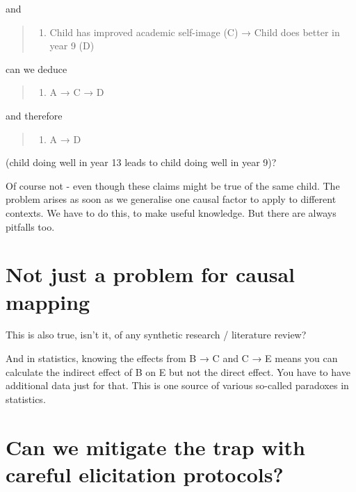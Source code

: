 \documentclass[
]{book}
\providecommand{\tightlist}{%
  \setlength{\itemsep}{0pt}\setlength{\parskip}{0pt}}
\begin{document}
and

\begin{quote}
\begin{enumerate}
\def\labelenumi{\arabic{enumi})}
\setcounter{enumi}{1}
\tightlist
\item
  Child has improved academic self-image (C) → Child does better in year 9 (D)
\end{enumerate}
\end{quote}

can we deduce

\begin{quote}
\begin{enumerate}
\def\labelenumi{\arabic{enumi})}
\setcounter{enumi}{2}
\tightlist
\item
  A → C → D
\end{enumerate}
\end{quote}

and therefore

\begin{quote}
\begin{enumerate}
\def\labelenumi{\arabic{enumi})}
\setcounter{enumi}{3}
\tightlist
\item
  A → D
\end{enumerate}
\end{quote}

(child doing well in year 13 leads to child doing well in year 9)?

Of course not - even though these claims might be true of the same child. The problem arises as soon as we generalise one causal factor to apply to different contexts. We have to do this, to make useful knowledge. But there are always pitfalls too.

\hypertarget{not-just-a-problem-for-causal-mapping}{%
\section{Not just a problem for causal mapping}\label{not-just-a-problem-for-causal-mapping}}

This is also true, isn't it, of any synthetic research / literature review?

And in statistics, knowing the effects from B → C and C → E means you can calculate the indirect effect of B on E but not the direct effect. You have to have additional data just for that. This is one source of various so-called paradoxes in statistics.

\hypertarget{can-we-mitigate-the-trap-with-careful-elicitation-protocols}{%
\section{Can we mitigate the trap with careful elicitation protocols?}\label{can-we-mitigate-the-trap-with-careful-elicitation-protocols}}
\end{document}
